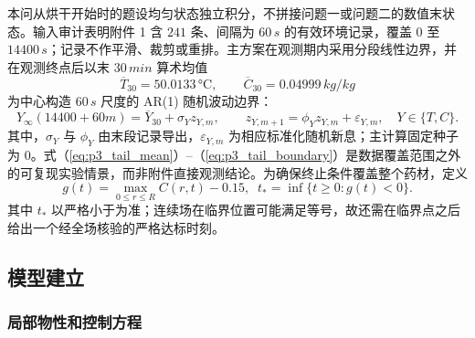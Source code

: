 \documentclass[withoutpreface,bwprint]{cumcmthesis}
\begin{document}
本问从烘干开始时的题设均匀状态独立积分，不拼接问题一或问题二的数值末状态。输入审计表明附件 1 含 $241$ 条、间隔为 $60\,\si{s}$ 的有效环境记录，覆盖 $0$ 至 $14400\,\si{s}$；记录不作平滑、裁剪或重排。主方案在观测期内采用分段线性边界，并在观测终点后以末 $30\,\si{min}$ 算术均值
\begin{equation}
\overline T_{30}=50.0133\,\si{\celsius},\qquad
\overline C_{30}=0.04999\,\si{kg/kg}
\label{eq:p3_tail_mean}
\end{equation}
为中心构造 $60\,\si{s}$ 尺度的 AR(1) 随机波动边界：
\begin{equation}
Y_\infty(14400+60m)=\overline Y_{30}+\sigma_Y z_{Y,m},\qquad
z_{Y,m+1}=\phi_Y z_{Y,m}+\varepsilon_{Y,m},\quad Y\in\{T,C\}.
\label{eq:p3_tail_boundary}
\end{equation}
其中，$\sigma_Y$ 与 $\phi_Y$ 由末段记录导出，$\varepsilon_{Y,m}$ 为相应标准化随机新息；主计算固定种子为 $0$。式（\ref{eq:p3_tail_mean}）--（\ref{eq:p3_tail_boundary}）是数据覆盖范围之外的可复现实验情景，而非附件直接观测结论。为确保终止条件覆盖整个药材，定义
\begin{equation}
g(t)=\max_{0\leq r\leq R}C(r,t)-0.15,\;\;
t_* =\inf\{t\geq0:g(t)<0\}.
\label{eq:p3_event}
\end{equation}
其中 $t_*$ 以严格小于为准；连续场在临界位置可能满足等号，故还需在临界点之后给出一个经全场核验的严格达标时刻。

\subsection{模型建立}

\subsubsection{局部物性和控制方程}
\end{document}
